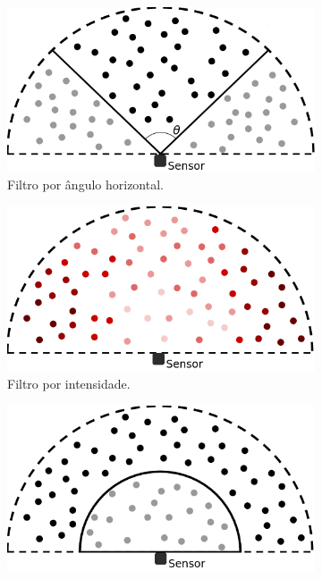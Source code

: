\begin{figure}[H]
    \centering
    \caption{Filtros simples de remoção de \textit{outliers}.}
    \begin{subfigure}[t]{0.4\textwidth}
        \includegraphics[width=\textwidth]{dados/figuras/angle_filter.png}
        \caption{Filtro por ângulo horizontal.}
        \label{fig:angle_filter}
    \end{subfigure}
    \hspace{3em}
    \begin{subfigure}[t]{0.4\textwidth}
        \includegraphics[width=\textwidth]{dados/figuras/intensity_filter.png}
        \caption{Filtro por intensidade.}
        \label{fig:intensity_filter}
    \end{subfigure}
    \begin{subfigure}[t]{0.4\textwidth}
        \includegraphics[width=\textwidth]{dados/figuras/distance_filter.png}

\end{subfigure}
\end{figure}

